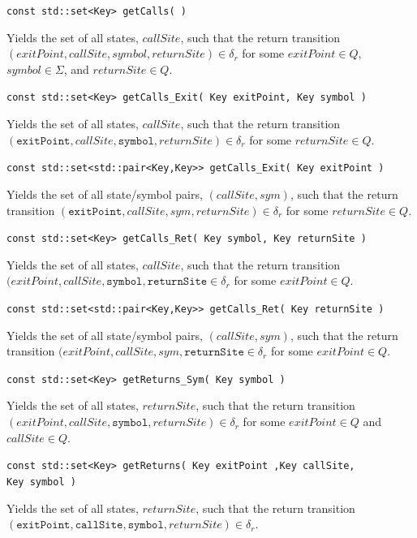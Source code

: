 \documentclass{llncs}
\begin{document}
\begin{description}
  \item\texttt{const std::set<Key> getCalls( )}

    Yields the set of all states, $callSite$, such that the return transition $(exitPoint,callSite,symbol,returnSite) \in \delta_r$ for some $exitPoint \in Q$, $symbol \in \Sigma$, and $returnSite \in Q$.

  \item\texttt{const std::set<Key> getCalls\_Exit( Key exitPoint, Key symbol )}

    Yields the set of all states, $callSite$, such that the return transition $(\texttt{exitPoint},callSite,\texttt{symbol},returnSite) \in \delta_r$ for some $returnSite \in Q$.

  \item\texttt{const std::set<std::pair<Key,Key>> getCalls\_Exit( Key exitPoint )}

    Yields the set of all state/symbol pairs, $(callSite,sym)$, such that the return transition $(\texttt{exitPoint},callSite,sym,returnSite) \in \delta_r$ for some $returnSite \in Q$.

  \item\texttt{const std::set<Key> getCalls\_Ret( Key symbol, Key returnSite )}

    Yields the set of all states, $callSite$, such that the return transition $(exitPoint,callSite,\texttt{symbol},\texttt{returnSite} \in \delta_r$ for some $exitPoint \in Q$.

  \item\texttt{const std::set<std::pair<Key,Key>> getCalls\_Ret( Key returnSite )}

    Yields the set of all state/symbol pairs, $(callSite,sym)$, such that the return transition $(exitPoint,callSite,sym,\texttt{returnSite} \in \delta_r$ for some $exitPoint \in Q$.

  \item\texttt{const std::set<Key> getReturns\_Sym( Key symbol )}

    Yields the set of all states, $returnSite$, such that the return transition $(exitPoint,callSite,\texttt{symbol},returnSite) \in \delta_r$ for some $exitPoint \in Q$ and $callSite \in Q$.

  \item\texttt{const std::set<Key> getReturns( Key exitPoint ,Key callSite,\\ \hspace*{3.25cm} Key symbol )}

    Yields the set of all states, $returnSite$, such that the return transition $(\texttt{exitPoint},\texttt{callSite},\texttt{symbol},returnSite) \in \delta_r$.


\end{description}
\end{document}
